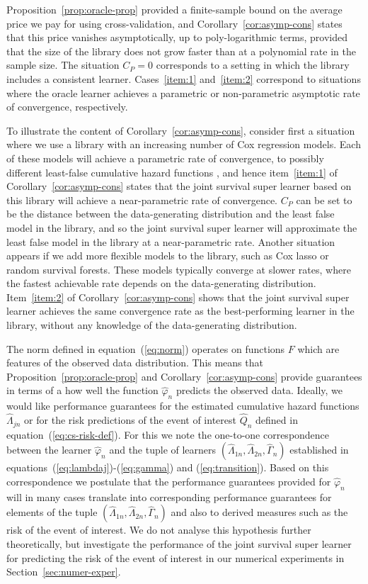 \documentclass[alpha-refs]{wiley-article}
\renewcommand{\phi}{\varphi}
\newcommand{\1}{\mathbb{1}}
\begin{document}
Proposition~\ref{prop:oracle-prop} provided a finite-sample bound
on the average price we pay for using cross-validation, and
Corollary~\ref{cor:asymp-cons} states that this price vanishes
asymptotically, up to poly-logarithmic terms, provided that the size
of the library does not grow faster than at a polynomial rate in the
sample size. The situation \( C_P=0 \) corresponds to a setting in
which the library includes a consistent learner. Cases~\ref{item:1}
and~\ref{item:2} correspond to situations where the oracle learner
achieves a parametric or non-parametric asymptotic rate of
convergence, respectively.

To illustrate the content of Corollary~\ref{cor:asymp-cons}, consider
first a situation where we use a library with an increasing number of
Cox regression models. Each of these models will achieve a parametric
rate of convergence, to possibly different least-false cumulative
hazard functions \citep{hjort1992inference}, and hence
item~\ref{item:1} of Corollary~\ref{cor:asymp-cons} states that the
joint survival super learner based on this library will achieve a
near-parametric rate of convergence.  \( C_P \) can be set to be the
distance between the data-generating distribution and the least false
model in the library, and so the joint survival super learner will
approximate the least false model in the library at a near-parametric
rate. Another situation appears if we add more flexible models to the
library, such as Cox lasso or random survival forests.  These models
typically converge at slower rates, where the fastest achievable rate
depends on the data-generating distribution.  Item~\ref{item:2} of
Corollary~\ref{cor:asymp-cons} shows that the joint survival super
learner achieves the same convergence rate as the best-performing
learner in the library, without any knowledge of the data-generating
distribution.

The norm defined in equation~(\ref{eq:norm}) operates on functions \(
F \) which are features of the observed data distribution. This means
that Proposition~\ref{prop:oracle-prop} and
Corollary~\ref{cor:asymp-cons} provide guarantees in terms of a how
well the function $\hat{\phi}_n$ predicts the observed data. Ideally,
we would like performance guarantees for the estimated cumulative
hazard functions $\hat{\Lambda}_{jn}$ or for the risk predictions of
the event of interest $\hat{Q}_{n}$ defined in
equation~(\ref{eq:cs-risk-def}). For this we note the one-to-one
correspondence between the learner $\hat{\phi}_n$ and the tuple of
learners \((\hat \Lambda_{1n},\hat \Lambda_{2n}, \hat \Gamma_{n})\)
established in equations~(\ref{eq:lambdaj})-(\ref{eq:gamma}) and
(\ref{eq:transition}). Based on this correspondence we postulate that
the performance guarantees provided for $\hat{\phi}_n$ will in many
cases translate into corresponding performance guarantees for elements
of the tuple \((\hat \Lambda_{1n},\hat \Lambda_{2n}, \hat
\Gamma_{n})\) and also to derived measures such as the risk of the
event of interest. We do not analyse this hypothesis further
theoretically, but investigate the performance of the joint survival
super learner for predicting the risk of the event of interest in our
numerical experiments in Section~\ref{sec:numer-exper}.
\end{document}
